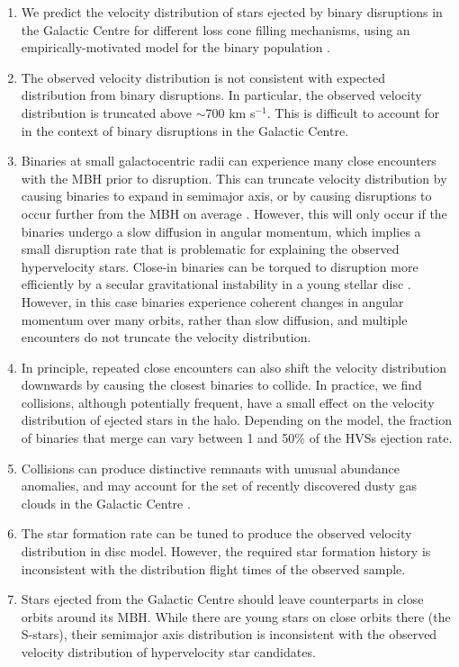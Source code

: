 \documentclass[fleqn,usenatbib]{mnras}
\begin{document}
\begin{enumerate}
\item We predict the velocity distribution of stars ejected by binary disruptions in the Galactic Centre for different loss cone filling mechanisms, using an empirically-motivated model for the binary population \citep{moe+2017}.

\item The observed velocity distribution is not consistent with expected distribution from binary disruptions. In particular, the observed velocity distribution is truncated above $\sim$700 km s$^{-1}$. This is difficult to account for in the context of binary disruptions in the Galactic Centre. 


\item Binaries at small galactocentric radii can experience many close encounters with the MBH prior to disruption. This can truncate velocity distribution by causing binaries to expand in semimajor axis, or by causing disruptions to occur further from the MBH on average \citep{zhang+2010_hvs, zhang+2013_hvs}. However, this will only occur if the binaries undergo a slow diffusion in angular momentum, which implies a small disruption rate that is problematic for explaining the observed hypervelocity stars. Close-in binaries can be torqued to disruption more efficiently by a secular gravitational instability in a young stellar disc \citep{madigan+2009, generozov&madigan2020}. However, in this case binaries experience coherent changes in angular momentum over many orbits, rather than slow diffusion, and multiple encounters do not truncate the velocity distribution.


\item  In principle, repeated close encounters can also shift the velocity distribution downwards by causing the closest binaries to collide. In practice, we find collisions, although potentially frequent,  have a small effect on the velocity distribution of ejected stars in the halo. Depending on the model, the fraction of binaries that merge can vary between 1 and 50\% of the HVSs ejection rate.


\item Collisions can produce distinctive remnants with unusual abundance anomalies, and may account for the set of recently discovered dusty gas clouds in the Galactic Centre \citep{gillessen+2012, ciurlo+2020}. 

\item The star formation rate can be tuned to produce the observed velocity distribution in disc model. However, the required 
star formation history is inconsistent with the distribution flight times of the observed sample. 

\item Stars ejected from the Galactic Centre should leave counterparts in close orbits around its MBH. While there are young stars on close orbits there (the S-stars), their semimajor axis distribution is inconsistent with the observed velocity distribution of hypervelocity star candidates.

\end{enumerate}
\end{document}
